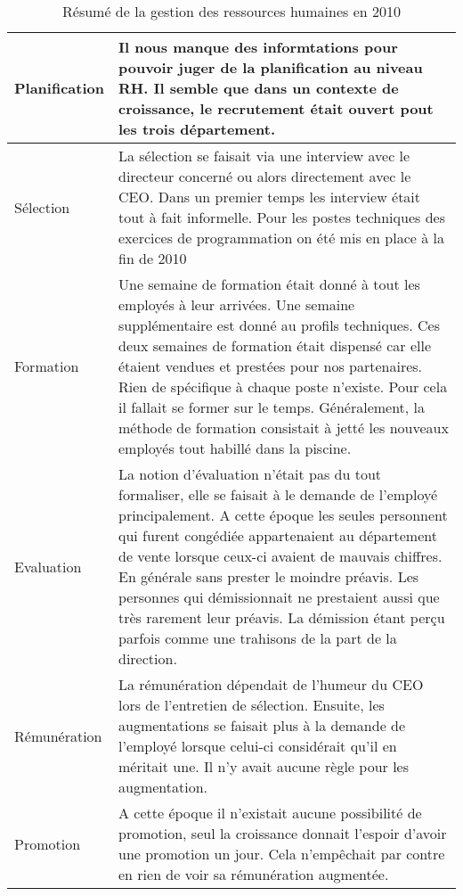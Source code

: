 \begin{table}[H]
  \caption{Résumé de la gestion des ressources humaines en 2010}
  \label{rh_2010}

  \begin{center}
    \begin{tabular}{l|p{}}
       Planification & Il nous manque des informtations pour pouvoir juger de la planification au niveau RH. Il semble que dans un contexte de croissance, le recrutement était ouvert pout les trois département.\\
       \hline
       Sélection & La sélection se faisait via une interview avec le directeur concerné ou alors directement avec le CEO. Dans un premier temps les interview était tout à fait informelle. Pour les postes techniques des exercices de programmation on été mis en place à la fin de 2010\\
       \hline
       Formation & Une semaine de formation était donné à tout les employés à leur arrivées. Une semaine supplémentaire est donné au profils techniques. Ces deux semaines de formation était dispensé car elle étaient vendues et prestées pour nos partenaires. Rien de spécifique à chaque poste n'existe. Pour cela il fallait se former sur le temps. Généralement, la méthode de formation consistait à jetté les nouveaux employés tout habillé dans la piscine.  \\
       \hline
       Evaluation & La notion d'évaluation n'était pas du tout formaliser, elle se faisait à le demande de l'employé principalement. A cette époque les seules personnent qui furent congédiée appartenaient au département de vente lorsque ceux-ci avaient de mauvais chiffres. En générale sans prester le moindre préavis. Les personnes qui démissionnait ne prestaient aussi que très rarement leur préavis. La démission étant perçu parfois comme une trahisons de la part de la direction.\\
       \hline
       Rémunération & La rémunération dépendait de l'humeur du CEO lors de l'entretien de sélection. Ensuite, les augmentations se faisait plus à la demande de l'employé lorsque celui-ci considérait qu'il en méritait une. Il n'y avait aucune règle pour les augmentation.\\
       \hline
       Promotion & A cette époque il n'existait aucune possibilité de promotion, seul la croissance donnait l'espoir d'avoir une promotion un jour. Cela n'empêchait par contre en rien de voir sa rémunération augmentée. \\
    \end{tabular}
  \end{center}
\end{table}

